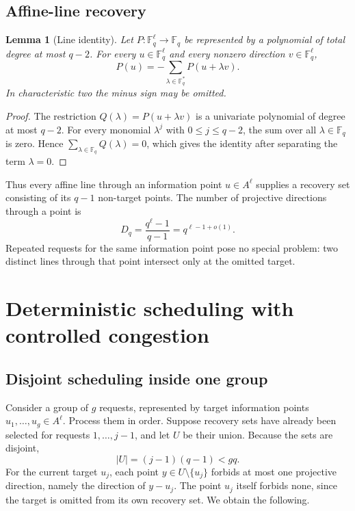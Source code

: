 \documentclass[11pt]{article}
\newtheorem{lemma}[theorem]{Lemma}
\theoremstyle{definition}
\newcommand{\F}{\mathbb{F}}
\begin{document}
\subsection{Affine-line recovery}

\begin{lemma}[Line identity]\label{lem:line-identity}
Let $P:\F_q^\ell\to\F_q$ be represented by a polynomial of total degree at most $q-2$.  For every $u\in\F_q^\ell$ and every nonzero direction $v\in\F_q^\ell$,
\[
 P(u)=-\sum_{\lambda\in\F_q^\ast}P(u+\lambda v).
\]
In characteristic two the minus sign may be omitted.
\end{lemma}

\begin{proof}
The restriction $Q(\lambda)=P(u+\lambda v)$ is a univariate polynomial of degree at most $q-2$.  For every monomial $\lambda^j$ with $0\le j\le q-2$, the sum over all $\lambda\in\F_q$ is zero.  Hence
$\sum_{\lambda\in\F_q}Q(\lambda)=0$, which gives the identity after separating the term $\lambda=0$.
\end{proof}

Thus every affine line through an information point $u\in A^\ell$ supplies a recovery set consisting of its $q-1$ non-target points.  The number of projective directions through a point is
\begin{equation}\label{eq:directions}
 D_q=\frac{q^\ell-1}{q-1}=q^{\ell-1+o(1)}.
\end{equation}
Repeated requests for the same information point pose no special problem: two distinct lines through that point intersect only at the omitted target.

\section{Deterministic scheduling with controlled congestion}

\subsection{Disjoint scheduling inside one group}

Consider a group of $g$ requests, represented by target information points
$u_1,\ldots,u_g\in A^\ell$.  Process them in order.  Suppose recovery sets have already been selected for requests $1,\ldots,j-1$, and let $U$ be their union.  Because the sets are disjoint,
\[
 |U|=(j-1)(q-1)<gq.
\]
For the current target $u_j$, each point $y\in U\setminus\{u_j\}$ forbids at most one projective direction, namely the direction of $y-u_j$.  The point $u_j$ itself forbids none, since the target is omitted from its own recovery set.  We obtain the following.
\end{document}

